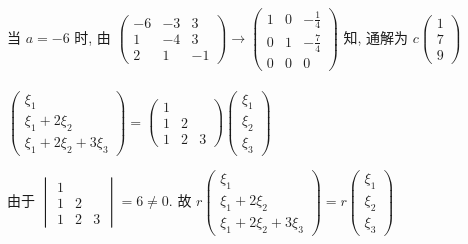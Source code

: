          当 \( a = -6 \) 时, 由 \( \begin{pmatrix}
             -6 & -3 & 3  \\
             1  & -4 & 3  \\
             2  & 1  & -1
         \end{pmatrix} \rightarrow \begin{pmatrix}
             1 & 0 & -\frac{1}{4} \\
             0 & 1 & -\frac{7}{4} \\
             0 & 0 & 0
         \end{pmatrix} \) 知, 通解为 \( c\begin{pmatrix}
             1 \\
             7 \\
             9
         \end{pmatrix} \)


     \paragraph{} %
         \( \begin{pmatrix}
             \xi_{1}          \\
             \xi_{1}+2\xi_{2} \\
             \xi_{1}+2\xi_{2}+3\xi_{3}
         \end{pmatrix} = \begin{pmatrix}
             1         \\
             1 & 2     \\
             1 & 2 & 3
         \end{pmatrix}\begin{pmatrix}
             \xi_{1} \\
             \xi_{2} \\
             \xi_{3}
         \end{pmatrix} \)

         由于 \( \begin{vmatrix}
             1         \\
             1 & 2     \\
             1 & 2 & 3
         \end{vmatrix} = 6 \neq 0 \). 故 \( r\begin{pmatrix}
             \xi_{1}          \\
             \xi_{1}+2\xi_{2} \\
             \xi_{1}+2\xi_{2}+3\xi_{3}
         \end{pmatrix} = r\begin{pmatrix}
             \xi_{1} \\
             \xi_{2} \\
             \xi_{3}
         \end{pmatrix} \)

